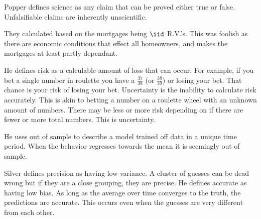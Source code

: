 \documentclass[12pt]{article}
\begin{document}
\begin{enumerate}
Popper defines science as any claim that can be proved either true or false. Unfalsifiable claims are inherently unscientific. 


They calculated based on the mortgages being $\iid$ R.V.'s. This was foolish as there are economic conditions that effect all homeowners, and makes the mortgages at least partly dependant. 


He defines risk as a calculable amount of loss that can occur. For example, if you bet a single number in roulette you have a $\frac{37}{38}$ (or $\frac{38}{39}$) or losing your bet. That chance is your risk of losing your bet. Uncertainty is the inability to calculate risk accurately. This is akin to betting a number on a roulette wheel with an unknown amount of numbers. There may be less  or more risk depending on if there are fewer or more total numbers. This is uncertainty.


He uses out of sample to describe a model trained off data in a unique time period. When the behavior regresses towards the mean it is seemingly out of sample.


Silver defines precision as having low variance. A cluster of guesses can be dead wrong but if they are a close grouping, they are precise. He defines accurate as having low bias. As long as the average over time converges to the truth, the predictions are accurate. This occurs even when the guesses are very different from each other. 

\end{enumerate}
\end{document}
